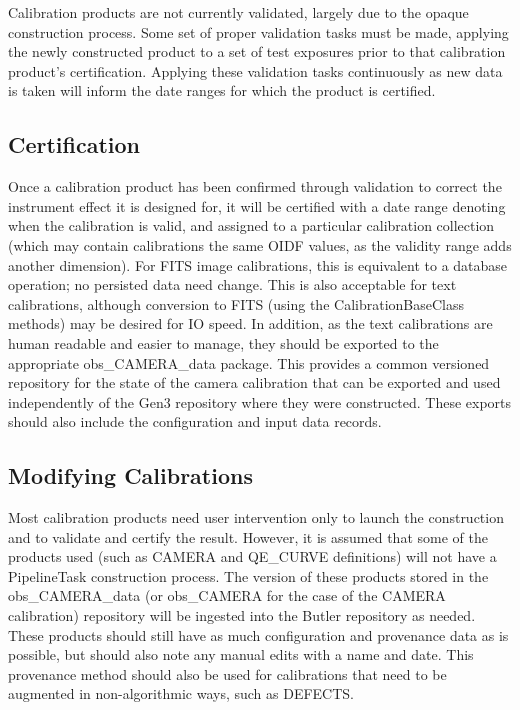 \documentclass[DM,authoryear,toc]{lsstdoc}
\begin{document}
Calibration products are not currently validated, largely due to the
opaque construction process.  Some set of proper validation tasks must
be made, applying the newly constructed product to a set of test
exposures prior to that calibration product's certification.  Applying
these validation tasks continuously as new data is taken will inform
the date ranges for which the product is certified.

\subsection{Certification}

Once a calibration product has been confirmed through validation to
correct the instrument effect it is designed for, it will be certified
with a date range denoting when the calibration is valid, and assigned
to a particular calibration collection (which may contain calibrations
the same OIDF values, as the validity range adds another dimension).
For FITS image calibrations, this is equivalent to a database
operation; no persisted data need change.  This is also acceptable for
text calibrations, although conversion to FITS (using the
CalibrationBaseClass methods) may be desired for IO speed. In
addition, as the text calibrations are human readable and easier to
manage, they should be exported to the appropriate obs_CAMERA_data
package.  This provides a common versioned repository for the state of
the camera calibration that can be exported and used independently of
the Gen3 repository where they were constructed.  These exports should
also include the configuration and input data records.

\subsection{Modifying Calibrations}

Most calibration products need user intervention only to launch the
construction and to validate and certify the result.  However, it is
assumed that some of the products used (such as CAMERA and QE_CURVE
definitions) will not have a PipelineTask construction process.  The
version of these products stored in the obs_CAMERA_data (or obs_CAMERA
for the case of the CAMERA calibration) repository will be ingested
into the Butler repository as needed.  These products should still
have as much configuration and provenance data as is possible, but
should also note any manual edits with a name and date.  This
provenance method should also be used for calibrations that need to be
augmented in non-algorithmic ways, such as DEFECTS.
\end{document}
